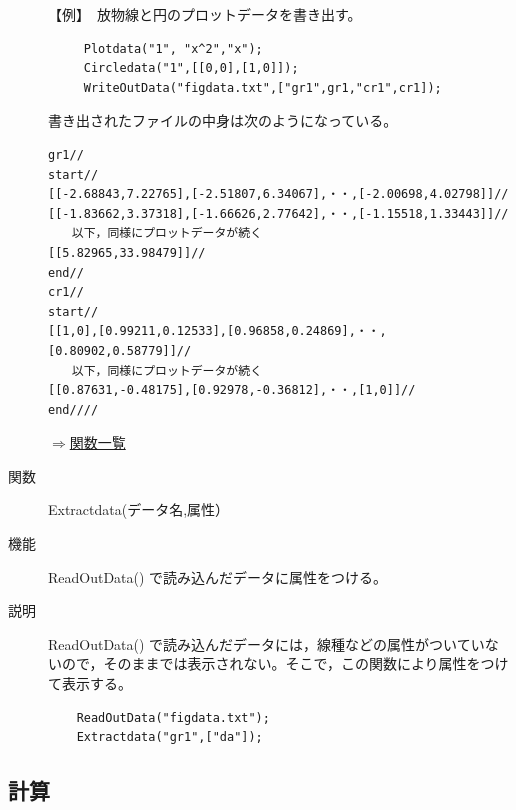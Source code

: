 \documentclass[papersize,a4paper,12pt,uplatex]{jsarticle}
\begin{document}
\begin{description}
【例】　放物線と円のプロットデータを書き出す。

\begin{verbatim}
     Plotdata("1", "x^2","x");
     Circledata("1",[[0,0],[1,0]]);
     WriteOutData("figdata.txt",["gr1",gr1,"cr1",cr1]);
\end{verbatim}

書き出されたファイルの中身は次のようになっている。

\begin{verbatim}
gr1// 
start//
[[-2.68843,7.22765],[-2.51807,6.34067],・・,[-2.00698,4.02798]]//
[[-1.83662,3.37318],[-1.66626,2.77642],・・,[-1.15518,1.33443]]//
　　以下，同様にプロットデータが続く
[[5.82965,33.98479]]//
end//
cr1//
start//
[[1,0],[0.99211,0.12533],[0.96858,0.24869],・・,[0.80902,0.58779]]//
　　以下，同様にプロットデータが続く
[[0.87631,-0.48175],[0.92978,-0.36812],・・,[1,0]]//
end////
\end{verbatim}
\begin{flushright}  \hyperlink{functionlist}{$\Rightarrow$関数一覧}\end{flushright}

\vspace{\baselineskip}
\hypertarget{extractdata}{}
\item[関数]  Extractdata(データ名,属性）
\item[機能]  ReadOutData() で読み込んだデータに属性をつける。
\item[説明]  ReadOutData() で読み込んだデータには，線種などの属性がついていないので，そのままでは表示されない。そこで，この関数により属性をつけて表示する。
\begin{verbatim}
    ReadOutData("figdata.txt");
    Extractdata("gr1",["da"]);
\end{verbatim}

\end{description}
\subsection{計算}
\end{document}

